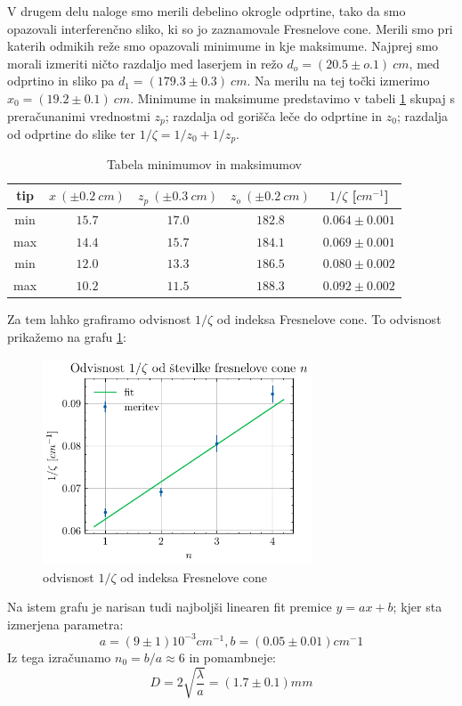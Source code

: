 \documentclass[12pt]{article}
\begin{document}
V drugem delu naloge smo merili debelino okrogle odprtine, tako da smo opazovali interferenčno sliko, ki so jo zaznamovale Fresnelove cone. Merili smo pri katerih odmikih reže smo opazovali minimume in kje maksimume. Najprej smo morali izmeriti ničto razdaljo med laserjem in režo $d_o = (20.5\pm o.1)\ cm$, med odprtino in sliko pa $d_1 = (179.3\pm 0.3)\ cm$. Na merilu na tej točki izmerimo $x_0 = (19.2\pm 0.1)\ cm$. Minimume in maksimume predstavimo v tabeli \ref{fresny} skupaj s preračunanimi vrednostmi $z_p$; razdalja od gorišča leče do odprtine in $z_0$; razdalja od odprtine do slike ter $1/\zeta = 1/z_0 + 1/z_p$.

\begin{table}[!ht]
\centering
\begin{tabular}{c|c|c|c|c}
    tip & $x\ (\pm 0.2\ cm) $ & $z_p\  (\pm 0.3\ cm) $ & $z_o\  (\pm 0.2\ cm) $ & $1/\zeta$ [$cm^{-1}$]\\\hline
    min & $15.7$ & $17.0$ & $182.8$ & $0.064\pm 0.001$ \\
    max & $14.4$ & $15.7$ & $184.1$ & $0.069\pm 0.001$ \\
    min & $12.0$ & $13.3$ & $186.5$ & $0.080\pm 0.002$ \\
    max & $10.2$ & $11.5$ & $188.3$ & $0.092\pm 0.002$ \\
\end{tabular}
\caption{Tabela minimumov in maksimumov}
\label{fresny}
\end{table}

\noindent Za tem lahko grafiramo odvisnost $1/\zeta$ od indeksa Fresnelove cone. To odvisnost prikažemo na grafu \ref{lin}:

\begin{figure}[ht]
\begin{center}
    \includegraphics[width=8cm]{lin.pdf}
    \caption{odvisnost $1/\zeta$ od indeksa Fresnelove cone}
    \label{lin}
\end{center}
\end{figure}
Na istem grafu je narisan tudi najboljši linearen fit premice $y=ax+b$; kjer sta izmerjena parametra:
\begin{equation*}
    a = (9\pm 1)10^{-3} cm^{-1}, b = (0.05\pm 0.01) cm^-1
\end{equation*}
Iz tega izračunamo $n_0=b/a\approx 6$ in pomambneje:
\begin{equation*}
    D = 2\sqrt{\frac{\lambda}{a}} = (1.7\pm 0.1) mm
\end{equation*}
\end{document}
